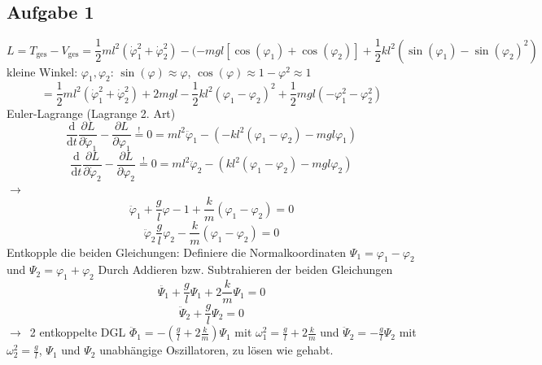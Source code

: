 \documentclass[oneside]{book}
\theoremstyle{definition}
\newcommand{\conseq}{$\rightarrow$~}
\renewcommand{\d}{\mathrm d}
\newcommand{\dd}[1]{\frac{\d}{\d #1}}
\newcommand{\ffpartial}[2]{\frac{\partial #1}{\partial #2}}
\newcommand{\vp}{\varphi}
\newcommand{\dvp}{\dot{\vp}}
\newcommand{\ddvp}{\ddot{\vp}}
\begin{document}
\subsection{Aufgabe 1}
$$L = T_\text{ges} - V_\text{ges} = \frac12 ml^2 (\dot{\varphi}_1^2 + \dot{\varphi}_2^2) - (- mgl [\cos(\varphi_1) + \cos(\varphi_2)] + \frac12 k l^2 (\sin(\varphi_1) - \sin(\vp_2)^2)$$
kleine Winkel: $\vp_1, \vp_2$: $\sin(\vp) \approx \vp$, $\cos(\vp) \approx 1 - \vp^2 \approx 1$
$$ = \frac12 ml^2 (\dot{\vp}_1^2 + \dot{\vp}_2^2) + 2mgl - \frac12 kl^2 (\vp_1 - \vp_2)^2 + \frac12 mgl(-\vp_1^2 - \vp_2^2)$$
Euler-Lagrange (Lagrange 2. Art)
$$\dd t \ffpartial{L}{\dvp_1} - \ffpartial{L}{\vp_1} \overset{!}{=} 0 = ml^2 \ddvp_1 - (-kl^2 (\vp_1 - \vp_2) - mgl\vp_1)$$
$$\dd t \ffpartial{L}{\dvp_2} - \ffpartial{L}{\vp_2} \overset{!}{=} 0 = ml^2 \ddvp_2 - (kl^2 (\vp_1 - \vp_2) - mgl\vp_2)$$
\conseq $$\ddvp_1 + \frac{g}{l} \vp-1 + \frac{k}{m}(\vp_1 - \vp_2) = 0$$
$$\ddvp_2 \frac{g}{l} \vp_2 - \frac{k}{m} (\vp_1 - \vp_2) = 0$$
Entkopple die beiden Gleichungen: Definiere die Normalkoordinaten $\Psi_1 = \vp_1 - \vp_2$ und $\Psi_2 = \vp_1 + \vp_2$
Durch Addieren bzw. Subtrahieren der beiden Gleichungen
$$\ddot{\Psi_1} + \frac{g}{l} \Psi_1 + 2 \frac{k}{m} \Psi_1 = 0$$
$$\ddot{\Psi}_2 + \frac{g}{l} \Psi_2 = 0$$
\conseq 2 entkoppelte DGL
$\ddot{\Phi}_1 = - (\frac{g}{l} + 2 \frac{k}{m}) \Psi_1$ mit $\omega_1^2 = \frac{g}{l} + 2 \frac{k}{m}$ und $\ddot{\Psi}_2 = - \frac{g}{l} \Psi_2$ mit $\omega_2^2 = \frac{g}{l}$, $\Psi_1$ und $\Psi_2$ unabhängige Oszillatoren, zu lösen wie gehabt.
\end{document}
